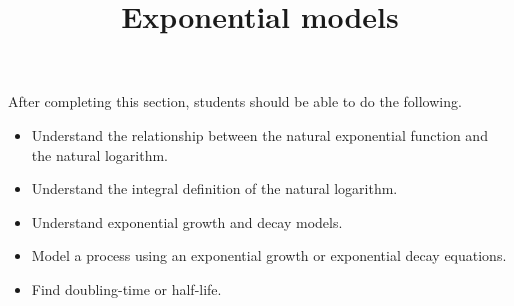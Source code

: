 \documentclass{ximera}
\title{Exponential models}
\begin{document}
\begin{abstract}
\end{abstract}

\maketitle

\begin{sectionOutcomes}

After completing this section, students should be able to do the following.

\begin{itemize}
\item Understand the relationship between the natural exponential
  function and the natural logarithm.
\item Understand the integral definition of the natural logarithm.
\item Understand exponential growth and decay models.
\item Model a process using an exponential growth or exponential
  decay equations.
\item Find doubling-time or half-life.
\end{itemize}

\end{sectionOutcomes}
\end{document}
